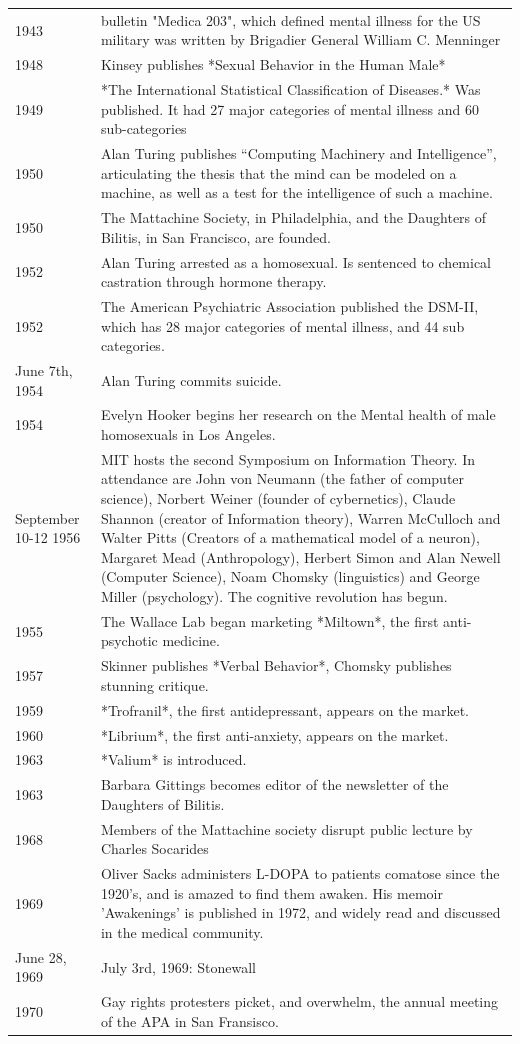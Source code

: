 \begin{longtable}[!t]{ | p{2cm} | p{11.8cm} | }
1943&bulletin "Medica 203", which defined mental illness for the US military was written by Brigadier General William C. Menninger \\
1948&Kinsey publishes *Sexual Behavior in the Human Male* \\
1949&*The International Statistical Classification of Diseases.* Was published. It had 27 major categories of mental illness and 60 sub-categories \\
1950&Alan Turing publishes “Computing Machinery and Intelligence”, articulating the thesis that the mind can be modeled on a machine, as well as a test for the intelligence of such a machine. \\
1950&The Mattachine Society, in Philadelphia,  and the Daughters of Bilitis, in San Francisco, are founded. \\
1952&Alan Turing arrested as a homosexual. Is sentenced to chemical castration through hormone therapy. \\
1952&The American Psychiatric Association published the DSM-II, which has 28 major categories of mental illness, and 44 sub categories. \\
June 7th, 1954&Alan Turing commits suicide. \\
1954&Evelyn Hooker begins her research on the Mental health of male homosexuals in Los Angeles. \\
September 10-12 1956&MIT hosts the second Symposium on Information Theory. In attendance are John von Neumann (the father of computer science), Norbert Weiner (founder of cybernetics), Claude Shannon (creator of Information theory), Warren McCulloch and Walter Pitts (Creators of a mathematical model of a neuron), Margaret Mead (Anthropology), Herbert Simon and Alan Newell (Computer Science), Noam Chomsky (linguistics) and George Miller (psychology). The cognitive revolution has begun.  \\
1955&The Wallace Lab began marketing *Miltown*, the first anti-psychotic medicine.  \\
1957&Skinner publishes *Verbal Behavior*, Chomsky publishes stunning critique. \\
1959&*Trofranil*, the first antidepressant, appears on the market. \\
1960&*Librium*, the first anti-anxiety, appears on the market. \\
1963&*Valium* is introduced. \\
1963&Barbara Gittings becomes editor of the newsletter of the Daughters of Bilitis. \\
1968&Members of the Mattachine society disrupt public lecture by Charles Socarides \\
1969&Oliver Sacks administers L-DOPA to patients comatose since the 1920's, and is amazed to find them awaken.  His memoir 'Awakenings' is published in 1972, and widely read and discussed in the medical community.  \\
June 28, 1969&July 3rd, 1969: Stonewall \\
1970&Gay rights protesters picket, and overwhelm, the annual meeting of the APA in San Fransisco. \\ \hline \hline


\end{longtable}
